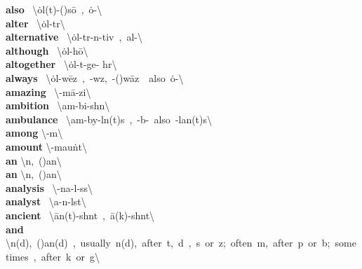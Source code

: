 \documentclass[10pt,a4paper]{article}
\begin{document}
\begin{multicols}{2}
\textbf{ also }\quad \ \textbackslash \textprimstress \.{o}l(t)-(\textsecstress )s\={o}\ ,\ \textprimstress \.{o}-\textbackslash \\
\textbf{ alter }\quad \ \textbackslash \textprimstress \.{o}l-t\textschwa r\textbackslash \\
\textbf{ alternative }\quad \ \textbackslash \.{o}l-\textprimstress t\textschwa r-n\textschwa -tiv\ ,\ al-\textbackslash \\
\textbf{ although }\quad \ \textbackslash \.{o}l-\textprimstress  h\={o}\textbackslash \\
\textbf{ altogether }\quad \ \textbackslash \textsecstress \.{o}l-t\textschwa -\textprimstress ge- h\textschwa r\textbackslash \\
\textbf{ always }\quad \ \textbackslash \textprimstress \.{o}l-w\={e}z\ ,\ -w\textschwa z,\ -(\textsecstress )w\={a}z\ \ also\ \textprimstress \.{o}-\textbackslash \\
\textbf{ amazing }\quad \ \textbackslash \textschwa -\textprimstress m\={a}-zi\engma \textbackslash \\
\textbf{ ambition }\quad \ \textbackslash am-\textprimstress bi-sh\textschwa n\textbackslash \\
\textbf{ ambulance }\quad \ \textbackslash \textprimstress am-by\textschwa -l\textschwa n(t)s\ ,\ -b\textschwa -\ also\ -\textsecstress lan(t)s\textbackslash \\
\textbf{ among }\quad \textbackslash \textschwa -\textprimstress m\textschwa \engma \textbackslash \\
\textbf{ amount }\quad \textbackslash \textschwa -\textprimstress mau\. nt\textbackslash \\
\textbf{ an }\quad \textbackslash \textschwa n,\ (\textprimstress )an\textbackslash \\
\textbf{ an }\quad \textbackslash \textschwa n,\ (\textprimstress )an\textbackslash \\
\textbf{ analysis }\quad \ \textbackslash \textschwa -\textprimstress na-l\textschwa -s\textschwa s\textbackslash \\
\textbf{ analyst }\quad \ \textbackslash \textprimstress a-n\textschwa -l\textschwa st\textbackslash \\
\textbf{ ancient }\quad \ \textbackslash \textprimstress \={a}n(t)-sh\textschwa nt\ ,\ \textprimstress \={a}\engma (k)-sh\textschwa nt\textbackslash \\
\textbf{ and }\quad \textbackslash \textschwa n(d),\ (\textprimstress )an(d)\ ,\ usually\ \textsuperscript{\textreve}n(d),\ after\ t,\ d\ ,\ s\ or\ z;\ often\ \textsuperscript{\textreve}m,\ after\ p\ or\ b;\ sometimes\ \textsuperscript{\textreve}\engma ,\ after\ k\ or\ g\textbackslash \\

\end{multicols}
\end{document}
